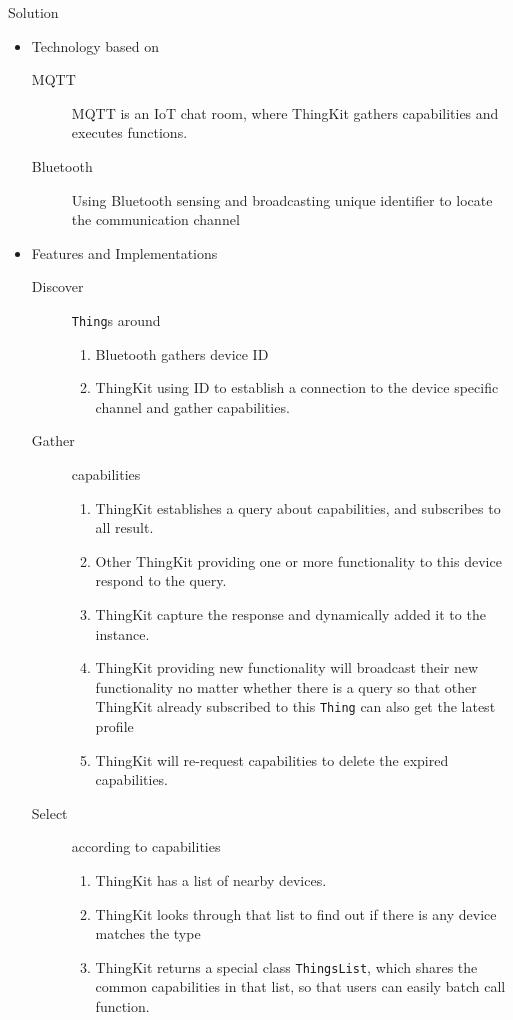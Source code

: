 \documentclass[a0paper,portrait]{baposter}
\begin{document}
\begin{poster}
\begin{posterbox}[name=solution,column=0,span=2,below=intro]{Solution}
\begin{itemize}
  \item Technology based on
  \begin{description}
    \item[MQTT] MQTT is an IoT chat room, where ThingKit gathers capabilities and executes functions.
    \item[Bluetooth] Using Bluetooth sensing and broadcasting unique identifier to locate the communication channel
  \end{description}
  \item Features and Implementations
  \begin {description}
    \item[Discover] \texttt{Thing}s around
    \begin{enumerate}
      \item Bluetooth gathers device ID
      \item ThingKit using ID to establish a connection to the device specific channel and gather capabilities.
    \end{enumerate}
    \item[Gather] capabilities
    \begin{enumerate}
      \item ThingKit establishes a query about capabilities, and subscribes to all result.
      \item Other ThingKit providing one or more functionality to this device respond to the query.
      \item ThingKit capture the response and dynamically added it to the instance.
      \item ThingKit providing new functionality will broadcast their new functionality no matter whether there is a query so that other ThingKit already subscribed to this \texttt{Thing} can also get the latest profile
      \item ThingKit will re-request capabilities to delete the expired capabilities.
    \end{enumerate}
    \item[Select] according to capabilities
    \begin{enumerate}
      \item ThingKit has a list of nearby devices.
      \item ThingKit looks through that list to find out if there is any device matches the type
      \item ThingKit returns a special class \texttt{ThingsList}, which shares the common capabilities in that list, so that users can easily batch call function.
    \end{enumerate}
  \end {description}
\end{itemize}
\end{posterbox}


\end{poster}
\end{document}
